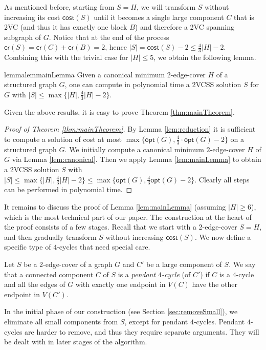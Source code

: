 \documentclass{theoretics}
\newcommand{\opt}{\mathsf{opt}}
\newcommand{\cost}{\mathsf{cost}}
\newcommand{\credit}{\mathsf{cr}}
\begin{document}
As mentioned before, starting from $S=H$, we will transform $S$ without increasing its cost $\cost(S)$ until it becomes a single large component $C$ that is 2VC (and thus it has exactly one block $B$) and therefore a 2VC spanning subgraph of $G$. Notice that at the end of the process $\credit(S)=\credit(C)+\credit(B)=2$, hence $|S|= \cost(S)-2\leq \frac{4}{3}|H|-2$. Combining this with the trivial case for $|H|\leq 5$, we obtain the following lemma. 
\begin{restatable}{lemma}{lemmainLemma}\label{lem:mainLemma}
Given a canonical minimum 2-edge-cover $H$ of a structured graph $G$, one can compute in polynomial time a 2VCSS solution $S$ for $G$ with $|S|\leq \max\{|H|,\frac{4}{3}|H| - 2\}$.
\end{restatable}

Given the above results, it is easy to prove Theorem \ref{thm:mainTheorem}.
\begin{proof}[Proof of Theorem \ref{thm:mainTheorem}]
By Lemma \ref{lem:reduction} it is sufficient to compute a solution of cost at most $\max\{\opt(G),\frac{4}{3}\cdot\opt(G) - 2\}$ on a structured graph $G$. We initially compute a canonical minimum $2$-edge-cover $H$ of $G$ via Lemma \ref{lem:canonical}.
Then we apply Lemma \ref{lem:mainLemma} to obtain a 2VCSS solution $S$ with $|S|\leq \max\{|H|,\frac{4}{3}|H|-2\}\leq \max\{\opt(G),\frac{4}{3}\opt(G)-2\}$. Clearly all steps can be performed in polynomial time. 
\end{proof}


It remains to discuss the proof of Lemma \ref{lem:mainLemma} (assuming $|H|\geq 6$), which is the most technical part of our paper. The construction at the heart of the proof consists of a few stages. Recall that we start with a 2-edge-cover $S=H$, and then gradually transform $S$ without increasing $\cost(S)$. We now define a specific type of $4$-cycles that need special care.

\begin{definition}
    Let $S$ be a 2-edge-cover of a graph $G$ and $C'$ be a large component of $S$. We say that a connected component $C$ of $S$ is a \emph{pendant $4$-cycle} (of $C'$) if $C$ is a $4$-cycle and all the edges of $G$ with exactly one endpoint in $V(C)$ have the other endpoint in $V(C')$.
\end{definition}

In the initial phase of our construction (see Section \ref{sec:removeSmall}), we eliminate all small components from $S$, except for pendant $4$-cycles. Pendant $4$-cycles are harder to remove, and thus they require separate arguments. They will be dealt with in later stages of the algorithm.
\end{document}
